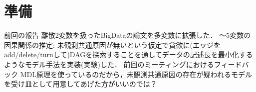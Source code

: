 \documentclass[dvipdfmx]{jsarticle}
\newcommand{\red}[1]{\textcolor{red}{#1}}
\begin{document}
\section{準備}


\begin{outline}
\1 前回の報告
   \2 離散2変数を扱ったBigDataの論文を多変数に拡張した．
      〜5変数の因果関係の推定: 未観測共通原因が無いという仮定で貪欲に(エッジをadd/delete/turnして)DAGを探索することを通してデータの記述長を最小化するようなモデル手法を実装(実験)した．
\1 前回のミーティングにおけるフィードバック
   \2 MDL原理を使っているのだから，未観測共通原因の存在が疑われるモデルを受け皿として用意してあげた方がいいのでは？
        

\end{outline}
\end{document}
